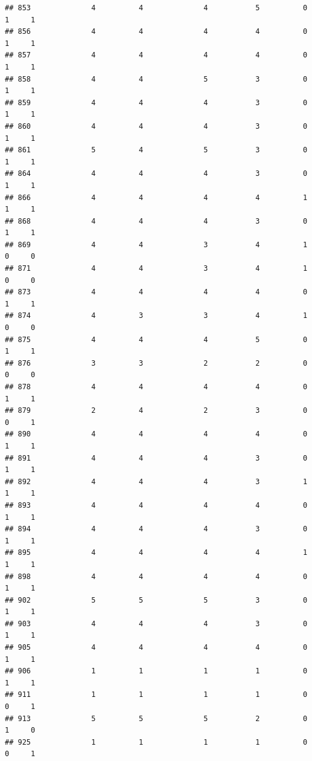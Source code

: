 \documentclass[
]{article}
\begin{document}
\begin{verbatim}
## 853              4          4              4           5          0    1     1
## 856              4          4              4           4          0    1     1
## 857              4          4              4           4          0    1     1
## 858              4          4              5           3          0    1     1
## 859              4          4              4           3          0    1     1
## 860              4          4              4           3          0    1     1
## 861              5          4              5           3          0    1     1
## 864              4          4              4           3          0    1     1
## 866              4          4              4           4          1    1     1
## 868              4          4              4           3          0    1     1
## 869              4          4              3           4          1    0     0
## 871              4          4              3           4          1    0     0
## 873              4          4              4           4          0    1     1
## 874              4          3              3           4          1    0     0
## 875              4          4              4           5          0    1     1
## 876              3          3              2           2          0    0     0
## 878              4          4              4           4          0    1     1
## 879              2          4              2           3          0    0     1
## 890              4          4              4           4          0    1     1
## 891              4          4              4           3          0    1     1
## 892              4          4              4           3          1    1     1
## 893              4          4              4           4          0    1     1
## 894              4          4              4           3          0    1     1
## 895              4          4              4           4          1    1     1
## 898              4          4              4           4          0    1     1
## 902              5          5              5           3          0    1     1
## 903              4          4              4           3          0    1     1
## 905              4          4              4           4          0    1     1
## 906              1          1              1           1          0    1     1
## 911              1          1              1           1          0    0     1
## 913              5          5              5           2          0    1     0
## 925              1          1              1           1          0    0     1

\end{verbatim}
\end{document}
